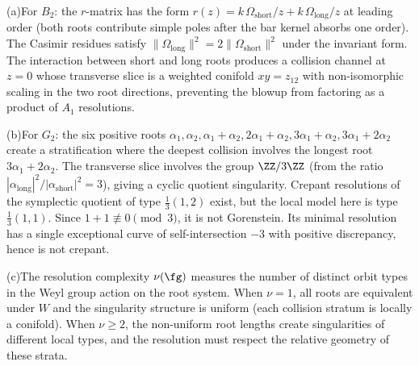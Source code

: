 \begin{remark}[Evidence]
(a)\enspace For $B_2$: the $r$-matrix has the form
$r(z) = k\,\Omega_{\mathrm{short}}/z + k\,\Omega_{\mathrm{long}}/z$
at leading order (both roots contribute simple poles after the
bar kernel absorbs one order). The Casimir residues satisfy
$\|\Omega_{\mathrm{long}}\|^2 = 2\|\Omega_{\mathrm{short}}\|^2$
under the invariant form. The interaction between short and long
roots produces a collision channel at $z = 0$ whose transverse slice
is a weighted conifold $xy = z_{12}$ with non-isomorphic scaling in
the two root directions, preventing the blowup from factoring as a
product of $A_1$ resolutions.

(b)\enspace For $G_2$: the six positive roots $\alpha_1, \alpha_2,
\alpha_1 + \alpha_2, 2\alpha_1 + \alpha_2,
3\alpha_1 + \alpha_2, 3\alpha_1 + 2\alpha_2$ create a stratification
where the deepest collision involves the longest root
$3\alpha_1 + 2\alpha_2$. The transverse slice involves the group
$\ZZ/3\ZZ$ (from the ratio
$|\alpha_{\mathrm{long}}|^2/|\alpha_{\mathrm{short}}|^2 = 3$),
giving a cyclic quotient singularity. Crepant resolutions of
the symplectic quotient of type $\tfrac{1}{3}(1,2)$ exist, but the
local model here is type $\tfrac{1}{3}(1,1)$. Since
$1+1\not\equiv 0\pmod 3$, it is not Gorenstein. Its minimal
resolution has a single exceptional curve of self-intersection $-3$
with positive discrepancy, hence is not crepant.

(c)\enspace The resolution complexity $\nu(\fg)$ measures the number
of distinct orbit types in the Weyl group action on the root system.
When $\nu = 1$, all roots are equivalent under $W$ and the
singularity structure is uniform (each collision stratum is locally
a conifold). When $\nu \ge 2$, the non-uniform root lengths create
singularities of different local types, and the resolution must
respect the relative geometry of these strata.
\end{remark}

